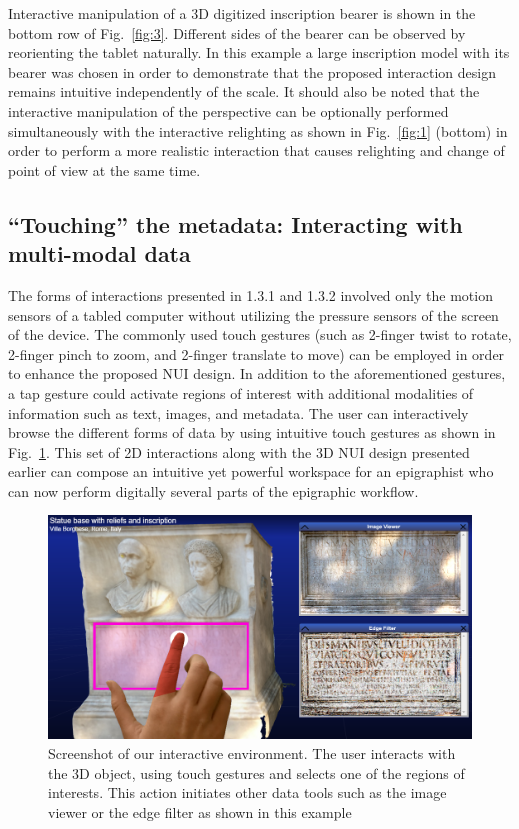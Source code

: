 \documentclass[amsthm,ebook]{saparticle}
\begin{document}
Interactive manipulation of a 3D digitized inscription bearer is shown in the bottom row of Fig.~\ref{fig:3}. Different sides of
the bearer can be observed by reorienting the tablet naturally. In this example a large inscription model with its
bearer was chosen in order to demonstrate that the proposed interaction design remains intuitive independently of the
scale. It should also be noted that the interactive manipulation of the perspective can be optionally performed
simultaneously with the interactive relighting as shown in Fig.~\ref{fig:1} (bottom) in order to perform a more realistic
interaction that causes relighting and change of point of view at the same time. 


\subsection{``Touching'' the metadata: Interacting with multi-modal data}


\noindent The forms of interactions presented in 1.3.1 and 1.3.2 involved only the motion sensors of a tabled computer without
utilizing the pressure sensors of the screen of the device. The commonly used touch gestures (such as 2-finger twist to
rotate, 2-finger pinch to zoom, and 2-finger translate to move) can be employed in order to enhance the proposed NUI
design. In addition to the aforementioned gestures, a tap gesture could activate regions of interest with additional
modalities of information such as text, images, and metadata. The user can interactively browse the different forms of
data by using intuitive touch gestures as shown in Fig.~\ref{fig:4}. This set of 2D interactions along with the 3D NUI design
presented earlier can compose an intuitive yet powerful workspace for an epigraphist who can now perform digitally
several parts of the epigraphic workflow. 




\begin{figure}[!hbp]
\centering
 \includegraphics[width=\columnwidth]{EAGLE2016cameraready-img006.png}
\caption{Screenshot of our interactive environment. The user interacts with the 3D object, using touch gestures and
selects one of the regions of interests. This action initiates other data tools such as the image viewer or the edge
filter as shown in this example}
\label{fig:4}
\end{figure}
\end{document}
